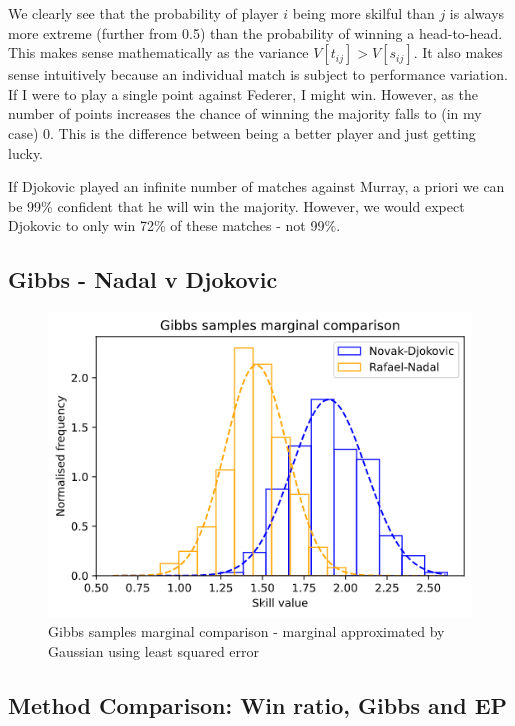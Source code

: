 \documentclass[]{article}
\newcommand{\figwidth}{0.6\linewidth}
\begin{document}
We clearly see that the probability of player $i$ being more skilful than $j$ is always more extreme (further from 0.5) than the probability of winning a head-to-head. This makes sense mathematically as the variance $V[t_{ij}] > V[s_{ij}]$. It also makes sense intuitively because an individual match is subject to performance variation. If I were to play a single point against Federer, I might win. However, as the number of points increases the chance of winning the majority falls to (in my case) 0. This is the difference between being a better player and just getting lucky.

If Djokovic played an infinite number of matches against Murray, a priori we can be 99\% confident that he will win the majority. However, we would expect Djokovic to only win 72\% of these matches - not 99\%.

\subsection{Gibbs - Nadal v Djokovic}

\begin{figure}[!h]
	\centering
	\includegraphics[width=\figwidth]{djokovic-nadal-marginal.png}
	\caption{Gibbs samples marginal comparison - marginal approximated by Gaussian using least squared error}
	\label{fig:djok-nadal-marginal}
\end{figure}



\subsection{Method Comparison: Win ratio, Gibbs and EP}
\end{document}
